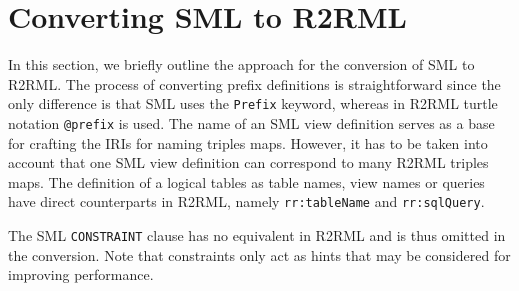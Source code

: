\section{Converting SML to R2RML}
\label{sec:sml2r2rml}
In this section, we briefly outline the approach for the conversion of SML to
R2RML.
The process of converting prefix definitions is straightforward since the only
difference is that SML uses the \texttt{Prefix} keyword, whereas in R2RML turtle notation \texttt{@prefix} is used.
The name of an SML view definition serves as a base for crafting the IRIs for
naming triples maps.
However, it has to be taken into account that one SML view definition can correspond to many R2RML triples maps. %
The definition of a logical tables as table names, view names or queries have
direct counterparts in R2RML, namely \texttt{rr:tableName} and
\texttt{rr:sqlQuery}.

The SML \texttt{CONSTRAINT} clause has no equivalent in R2RML and
is thus omitted in the conversion. Note that constraints only act as hints that
may be considered for improving performance.%




